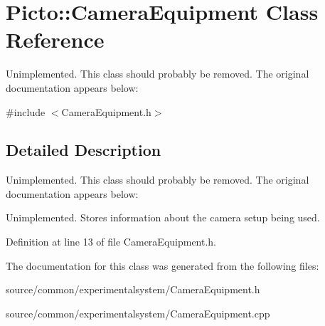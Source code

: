 \hypertarget{class_picto_1_1_camera_equipment}{\section{Picto\-:\-:Camera\-Equipment Class Reference}
\label{class_picto_1_1_camera_equipment}
}


Unimplemented. This class should probably be removed. The original documentation appears below\-:  




{\ttfamily \#include $<$Camera\-Equipment.\-h$>$}



\subsection{Detailed Description}
Unimplemented. This class should probably be removed. The original documentation appears below\-: 

Unimplemented. Stores information about the camera setup being used. 

Definition at line 13 of file Camera\-Equipment.\-h.



The documentation for this class was generated from the following files\-:\begin{DoxyCompactItemize}
\item 
source/common/experimentalsystem/Camera\-Equipment.\-h\item 
source/common/experimentalsystem/Camera\-Equipment.\-cpp\end{DoxyCompactItemize}
